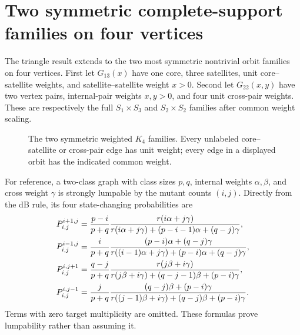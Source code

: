 \section{Two symmetric complete-support families on four vertices}
\label{sec:n4}

The triangle result extends to the two most symmetric nontrivial orbit
families on four vertices.  First let $G_{13}(x)$ have one core, three
satellites, unit core--satellite weights, and satellite--satellite weight
$x>0$.  Second let $G_{22}(x,y)$ have two vertex pairs, internal-pair weights
$x,y>0$, and four unit cross-pair weights.  These are respectively the full
$S_1\times S_3$ and $S_2\times S_2$ families after common weight scaling.

\begin{figure}[ht]
\centering
{}
\caption{The two symmetric weighted $K_4$ families.  Every unlabeled
core--satellite or cross-pair edge has unit weight; every edge in a displayed
orbit has the indicated common weight.}
\label{fig:k4-families}
\end{figure}

For reference, a two-class graph with class sizes $p,q$, internal weights
$\alpha,\beta$, and cross weight $\gamma$ is strongly lumpable by the mutant
counts $(i,j)$.  Directly from the dB rule, its four state-changing
probabilities are
\begin{align}
 P_{i,j}^{i+1,j}
 &=\frac{p-i}{p+q}
   \frac{r(i\alpha+j\gamma)}
   {r(i\alpha+j\gamma)+(p-i-1)\alpha+(q-j)\gamma},\notag\\
 P_{i,j}^{i-1,j}
 &=\frac{i}{p+q}
   \frac{(p-i)\alpha+(q-j)\gamma}
   {r((i-1)\alpha+j\gamma)+(p-i)\alpha+(q-j)\gamma},\notag\\
 P_{i,j}^{i,j+1}
 &=\frac{q-j}{p+q}
   \frac{r(j\beta+i\gamma)}
   {r(j\beta+i\gamma)+(q-j-1)\beta+(p-i)\gamma},\notag\\
 P_{i,j}^{i,j-1}
 &=\frac{j}{p+q}
   \frac{(q-j)\beta+(p-i)\gamma}
   {r((j-1)\beta+i\gamma)+(q-j)\beta+(p-i)\gamma}.
 \label{eq:two-class-chain}
\end{align}
Terms with zero target multiplicity are omitted.  These formulas prove
lumpability rather than assuming it.

